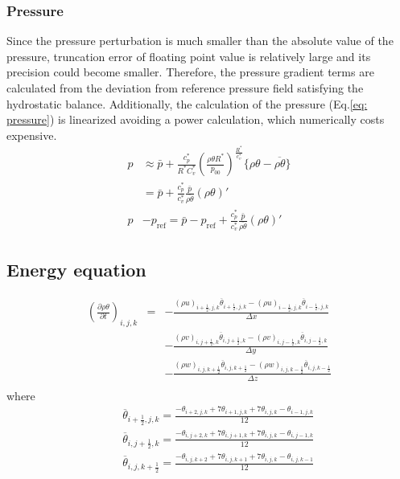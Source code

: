 \subsubsection{Pressure}
Since the pressure perturbation is much smaller than the absolute value of the pressure,
truncation error of floating point value is relatively large and its precision could become smaller.
Therefore, the pressure gradient terms are calculated from the deviation from reference pressure field satisfying the hydrostatic balance.
Additionally, the calculation of the pressure (Eq.\ref{eq: pressure}) is linearized avoiding a power calculation, which numerically costs expensive.
\begin{align}
  p
  &\approx \bar{p} + \frac{c_p^*}{R^* C_v^*}\left(\frac{\rho \theta R^*}{p_{00}}\right)^{\frac{R^*}{c_{v}^*}}  \{\rho \theta - \overline{\rho \theta}\} \nonumber \\
  &= \bar{p} + \frac{c_p^*}{c_v^*} \frac{\bar{p}}{\overline{\rho \theta}} (\rho \theta)' \\
  p &- p_\mathrm{ref}
  = \bar{p} - p_\mathrm{ref}
  + \frac{c_p^*}{c_v^*} \frac{\bar{p}}{\overline{\rho \theta}} (\rho \theta)'
\end{align}


\subsection{Energy equation}

\begin{eqnarray}
\left(\frac{\partial \rho \theta}{\partial t}\right)_{i,j,k}
&=& - \frac{(\rho u)_{i+\frac{1}{2},j,k} \overline{\theta}_{i+\frac{1}{2},j,k}
           -(\rho u)_{i-\frac{1}{2},j,k} \overline{\theta}_{i-\frac{1}{2},j,k}}
     {\Delta x}\nonumber\\
& &  - \frac{(\rho v)_{i,j+\frac{1}{2},k} \overline{\theta}_{i,j+\frac{1}{2},k}
           -(\rho v)_{i,j-\frac{1}{2},k} \overline{\theta}_{i,j-\frac{1}{2},k}}
     {\Delta y}\nonumber\\
& &  - \frac{(\rho w)_{i,j,k+\frac{1}{2}} \overline{\theta}_{i,j,k+\frac{1}{2}}
           -(\rho w)_{i,j,k-\frac{1}{2}} \overline{\theta}_{i,j,k-\frac{1}{2}}}
     {\Delta z}\nonumber\\
\end{eqnarray}
where
\begin{eqnarray}
&& \overline{\theta}_{i+\frac{1}{2},j,k} =
\frac{-\theta_{i+2,j,k}+7\theta_{i+1,j,k}+7\theta_{i,j,k}-\theta_{i-1,j,k}}{12}\\
&& \overline{\theta}_{i,j+\frac{1}{2},k} =
\frac{-\theta_{i,j+2,k}+7\theta_{i,j+1,k}+7\theta_{i,j,k}-\theta_{i,j-1,k}}{12}\\
&& \overline{\theta}_{i,j,k+\frac{1}{2}} =
\frac{-\theta_{i,j,k+2}+7\theta_{i,j,k+1}+7\theta_{i,j,k}-\theta_{i,j,k-1}}{12}
\end{eqnarray}

